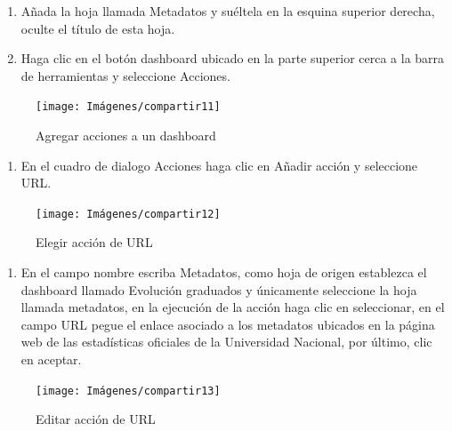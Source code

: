 \documentclass[
]{book}
\providecommand{\tightlist}{%
  \setlength{\itemsep}{0pt}\setlength{\parskip}{0pt}}
\begin{document}
\begin{enumerate}
\def\labelenumi{\arabic{enumi}.}
\setcounter{enumi}{5}
\item
  Añada la hoja llamada Metadatos y suéltela en la esquina superior derecha, oculte el título de esta hoja.
\item
  Haga clic en el botón dashboard ubicado en la parte superior cerca a la barra de herramientas y seleccione Acciones.
\end{enumerate}

\begin{figure}

{\centering \texttt{[image: Imágenes/compartir11]} 

}

\caption{Agregar acciones a un dashboard}\label{fig:agregaraccion-fig}
\end{figure}

\begin{enumerate}
\def\labelenumi{\arabic{enumi}.}
\setcounter{enumi}{7}
\tightlist
\item
  En el cuadro de dialogo Acciones haga clic en Añadir acción y seleccione URL.
\end{enumerate}

\begin{figure}

{\centering \texttt{[image: Imágenes/compartir12]} 

}

\caption{Elegir acción de URL}\label{fig:editaraccion-fig}
\end{figure}

\begin{enumerate}
\def\labelenumi{\arabic{enumi}.}
\setcounter{enumi}{8}
\tightlist
\item
  En el campo nombre escriba Metadatos, como hoja de origen establezca el dashboard llamado Evolución graduados y únicamente seleccione la hoja llamada metadatos, en la ejecución de la acción haga clic en seleccionar, en el campo URL pegue el enlace asociado a los metadatos ubicados en la página web de las estadísticas oficiales de la Universidad Nacional, por último, clic en aceptar.
\end{enumerate}

\begin{figure}

{\centering \texttt{[image: Imágenes/compartir13]} 

}

\caption{Editar acción de URL}\label{fig:editaraccionURL-fig}
\end{figure}
\end{document}
